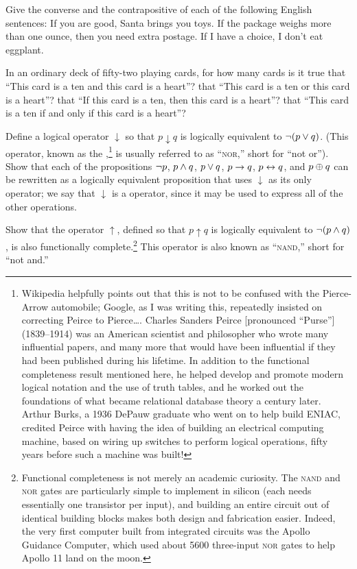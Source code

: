 \begin{exercises}
\problem Give the converse and the contrapositive of each of
the following English sentences:
\ppart If you are good, Santa brings you toys.
\ppart If the package weighs more than one ounce, then you need extra postage.
\ppart If I have a choice, I don't eat eggplant.

\problem In an ordinary deck of fifty-two playing cards, for how many cards is it true 
\ppart that ``This card is a ten and this card is a heart''?
\ppart that ``This card is a ten or this card is a heart''?
\ppart that ``If this card is a ten, then this card is a heart''?
\ppart that ``This card is a ten if and only if this card is a heart''?

\problem Define a logical operator $\downarrow$ so that
$p\downarrow q$ is logically equivalent to $\lnot(p\vee q)$.
(This operator, known as the ,\footnote{Wikipedia helpfully points out that this is not to be confused with the Pierce-Arrow automobile; Google, as I was writing this, repeatedly insisted on correcting Peirce to Pierce\ldots. Charles Sanders Peirce [pronounced ``Purse''] (1839--1914) was an American scientist and philosopher who wrote many influential papers, and many more that would have been influential if they had been published during his lifetime. In addition to the functional completeness result mentioned here, he helped develop and promote modern logical notation and the use of truth tables, and he worked out the foundations of what became relational database theory a century later. Arthur Burks, a 1936 DePauw graduate who went on to help build ENIAC, credited Peirce with having the idea of building an electrical computing machine, based on wiring up switches to perform logical operations, fifty years before such a machine was built!} is usually referred to as ``\textsc{nor},'' short 
for ``not or'').  Show that each of the propositions
$\lnot p$, $p\wedge q$, $p\vee q$, $p\rightarrow q$, $p\leftrightarrow q$, and
$p\oplus q$ can be rewritten as a logically equivalent proposition
that uses $\downarrow$ as its only operator; we say that $\downarrow$ is a  operator, since it may be used to express all of the other operations.

\problem Show that the  operator $\uparrow$, defined so that $p\uparrow q$ is
logically equivalent to $\lnot(p\wedge q)$, is also functionally complete.\footnote{Functional completeness is not merely an academic curiosity. The \textsc{nand} and \textsc{nor} gates are particularly simple to implement in silicon (each needs essentially one transistor per input), and building an entire circuit out of identical building blocks makes both design and fabrication easier. Indeed, the very first computer built from integrated circuits was the Apollo Guidance Computer, which used about 5600 three-input \textsc{nor} gates to help Apollo 11 land on the moon.} This operator is also known as ``\textsc{nand},'' short for ``not and.''

\end{exercises}


